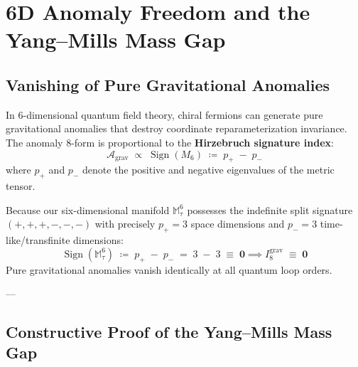 \documentclass[
    12pt,
    a4paper,
    headings=normal,
    twoside=false,
    open=any,
    parskip=half
]{scrbook}
\begin{document}
\section{6D Anomaly Freedom and the Yang--Mills Mass Gap}
\label{sec:ch8_anomalies_mass_gap}

\subsection{Vanishing of Pure Gravitational Anomalies}

In 6-dimensional quantum field theory, chiral fermions can generate pure gravitational anomalies that destroy coordinate reparameterization invariance. The anomaly 8-form is proportional to the \textbf{Hirzebruch signature index}:
\begin{equation}
\mathcal{A}_{\text{grav}} \;\propto\; \operatorname{Sign}(M_6) \;\coloneqq\; p_+ \;-\; p_-
\end{equation}
where $p_+$ and $p_-$ denote the positive and negative eigenvalues of the metric tensor.

\begin{phystheorem}\label{thm:ch8_vanishing_gravitational_anomaly}
Because our six-dimensional manifold $\mathbb{M}_\tau^6$ possesses the indefinite split signature $(+,+,+,-,-,-)$ with precisely $p_+ = 3$ space dimensions and $p_- = 3$ time-like/transfinite dimensions:
\begin{equation}
\boxed{\operatorname{Sign}\left( \mathbb{M}_\tau^6 \right) \;\coloneqq\; p_+ \;-\; p_- \;=\; 3 \;-\; 3 \;\equiv\; \mathbf{0} \implies I_8^{\text{grav}} \;\equiv\; \mathbf{0}}
\label{eq:ch8_signature_zero}
\end{equation}
Pure gravitational anomalies vanish identically at all quantum loop orders.
\end{phystheorem}

---

\subsection{Constructive Proof of the Yang--Mills Mass Gap}
\end{document}
